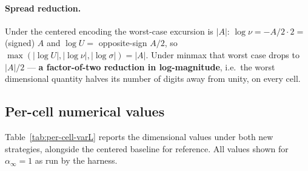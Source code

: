 \documentclass[11pt]{article}
\begin{document}
\paragraph{Spread reduction.}
Under the centered encoding the worst-case excursion is $|A|$:
$\log\nu = -A/2 \cdot 2 = $ (signed) $A$ and $\log U =$ opposite-sign
$A/2$, so $\max(|\log U|,|\log\nu|,|\log\sigma|) = |A|$. Under minmax
that worst case drops to $|A|/2$ — \textbf{a factor-of-two reduction in
log-magnitude}, i.e.\ the worst dimensional quantity halves its number
of digits away from unity, on every cell.

\subsection{Per-cell numerical values}

Table~\ref{tab:per-cell-varL} reports the dimensional values under
both new strategies, alongside the centered baseline for reference.
All values shown for $\alpha_\infty = 1$ as run by the harness.
\end{document}
